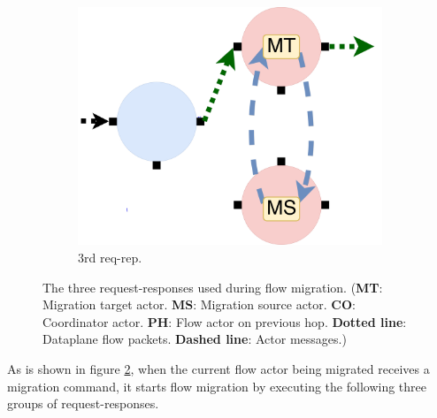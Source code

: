 \begin{figure}[!h]
\begin{subfigure}[t]{0.33\linewidth}
 \centering
   \includegraphics[width=\columnwidth]{figure/nfactor-mig3.pdf}
   \caption{3rd req-rep.}\label{fig:mig3} \end{subfigure}\hfill
 \caption{The three request-responses used during flow migration. (\textbf{MT}: Migration target actor. \textbf{MS}: Migration source actor. \textbf{CO}: Coordinator actor. \textbf{PH}: Flow actor on previous hop. \textbf{Dotted line}: Dataplane flow packets. \textbf{Dashed line}: Actor messages.)}
\label{fig:mig}
\end{figure}

As is shown in figure \ref{fig:mig}, when the current flow actor being migrated receives a migration command, it starts flow migration by executing the following three groups of request-responses.

